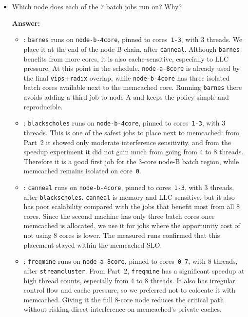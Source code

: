 \begin{enumerate}
\begin{enumerate}
\begin{itemize}
        \item Which node does each of the 7 batch jobs run on? Why?

        \textbf{Answer:}
        \begin{itemize}
            \item {}: \texttt{barnes} runs on
            \texttt{node-b-4core}, pinned to cores~\texttt{1-3}, with 3
            threads. We place it at the end of the node-B chain, after
            \texttt{canneal}. Although \texttt{barnes} benefits from more cores,
            it is also cache-sensitive, especially to LLC pressure. At this
            point in the schedule, \texttt{node-a-8core} is already used by the
            final \texttt{vips}+\texttt{radix} overlap, while
            \texttt{node-b-4core} has three isolated batch cores available next
            to the memcached core. Running \texttt{barnes} there avoids adding a
            third job to node A and keeps the policy simple and reproducible.
            
            \item {}: \texttt{blackscholes} runs on
            \texttt{node-b-4core}, pinned to cores~\texttt{1-3}, with 3
            threads. This is one of the safest jobs to place next to memcached:
            from Part~2 it showed only moderate interference sensitivity, and
            from the speedup experiment it did not gain much from going from 4
            to 8 threads. Therefore it is a good first job for the 3-core
            node-B batch region, while memcached remains isolated on
            core~\texttt{0}.
            
            \item {}: \texttt{canneal} runs on
            \texttt{node-b-4core}, pinned to cores~\texttt{1-3}, with 3
            threads, after \texttt{blackscholes}. \texttt{canneal} is memory
            and LLC sensitive, but it also has poor scalability compared with
            the jobs that benefit most from all 8 cores. Since the second
            machine has only three batch cores once memcached is allocated, we
            use it for jobs where the opportunity cost of not using 8 cores is
            lower. The measured runs confirmed that this placement stayed within
            the memcached SLO.
            
            \item {}: \texttt{freqmine} runs on
            \texttt{node-a-8core}, pinned to cores~\texttt{0-7}, with 8
            threads, after \texttt{streamcluster}. From Part~2,
            \texttt{freqmine} has a significant speedup at high thread counts,
            especially from 4 to 8 threads. It also has irregular control flow
            and cache pressure, so we preferred not to colocate it with
            memcached. Giving it the full 8-core node reduces the critical path
            without risking direct interference on memcached's private caches.
            

\end{itemize}
\end{itemize}
\end{enumerate}
\end{enumerate}
